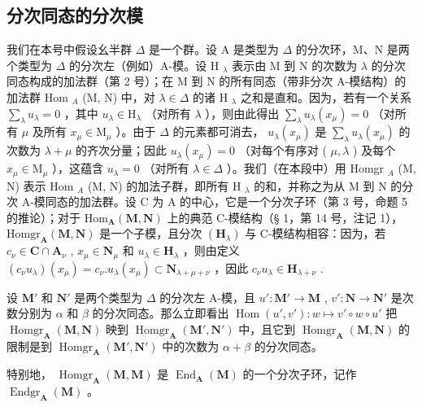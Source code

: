 \subsection{分次同态的分次模}

我们在本号中假设幺半群 \(\Delta\) 是一个群。设 A 是类型为 \(\Delta\) 的分次环，M、N 是两个类型为 \(\Delta\) 的分次左（例如）A-模。设 H \(_{\lambda}\) 表示由 M 到 N 的次数为 \(\lambda\) 的分次同态构成的加法群（第 2 号）；在 M 到 N 的所有同态（带非分次 A-模结构）的加法群 Hom \(_{A}\) (M, N) 中，对 \(\lambda \in \Delta\) 的诸 H \(_{\lambda}\) 之和是直和。因为，若有一个关系 \(\sum_{\lambda} u_{\lambda} = 0\) ，其中 \(u_{\lambda} \in \mathrm{H}_{\lambda}\) （对所有 \(\lambda\) ），则由此得出 \(\sum_{\lambda} u_{\lambda}(x_{\mu}) = 0\) （对所有 \(\mu\) 及所有 \(x_{\mu} \in \mathrm{M}_{\mu}\) ）。由于 \(\Delta\) 的元素都可消去， \(u_{\lambda}(x_{\mu})\) 是 \(\sum_{\lambda} u_{\lambda}(x_{\mu})\) 的次数为 \(\lambda + \mu\) 的齐次分量；因此 \(u_{\lambda}(x_{\mu}) = 0\) （对每个有序对 ( \(\mu, \lambda\) ) 及每个 \(x_{\mu} \in \mathrm{M}_{\mu}\) ），这蕴含 \(u_{\lambda} = 0\) （对所有 \(\lambda \in \Delta\) ）。我们（在本段中）用 Homgr \(_{A}\) (M, N) 表示 Hom \(_{A}\) (M, N) 的加法子群，即所有 H \(_{\lambda}\) 的和，并称之为从 M 到 N 的分次 A-模同态的加法群。设 C 为 A 的中心，它是一个分次子环（第 3 号，命题 5 的推论）；对于 \(\mathrm{Hom}_{\mathbf{A}}(\mathbf{M},\mathbf{N})\) 上的典范 C-模结构（§ 1，第 14 号，注记 1）， \(\mathrm{Homgr}_{\mathbf{A}}(\mathbf{M},\mathbf{N})\) 是一个子模，且分次 \((\mathbf{H}_{\lambda})\) 与 C-模结构相容：因为，若 \(c_{\nu}\in \mathbf{C}\cap \mathbf{A}_{\nu}\) , \(x_{\mu}\in \mathbf{N}_{\mu}\) 和 \(u_{\lambda}\in \mathbf{H}_{\lambda}\) ，则由定义 \((c_{\nu}u_{\lambda})(x_{\mu}) = c_{\nu}.u_{\lambda}(x_{\mu})\subset \mathbf{N}_{\lambda +\mu +\nu}\) ，因此 \(c_{\nu}u_{\lambda}\in \mathbf{H}_{\lambda +\nu}\) .

设 \(\mathbf{M}'\) 和 \(\mathbf{N}'\) 是两个类型为 \(\Delta\) 的分次左 A-模，且 \(u':\mathbf{M}'\to\mathbf{M}\) , \(v':\mathbf{N}\to\mathbf{N}'\) 是次数分别为 \(\alpha\) 和 \(\beta\) 的分次同态。那么立即看出 \(\operatorname{Hom}(u',v')\colon w\mapsto v'\circ w\circ u'\) 把 \(\operatorname{Homgr}_{\mathbf{A}}(\mathbf{M},\mathbf{N})\) 映到 \(\operatorname{Homgr}_{\mathbf{A}}(\mathbf{M}',\mathbf{N}')\) 中，且它到 \(\operatorname{Homgr}_{\mathbf{A}}(\mathbf{M},\mathbf{N})\) 的限制是到 \(\operatorname{Homgr}_{\mathbf{A}}(\mathbf{M}',\mathbf{N}')\) 中的次数为 \(\alpha+\beta\) 的分次同态。

特别地， \(\operatorname{Homgr}_{\mathbf{A}}(\mathbf{M}, \mathbf{M})\) 是 \(\operatorname{End}_{\mathbf{A}}(\mathbf{M})\) 的一个分次子环，记作 \(\operatorname{Endgr}_{\mathbf{A}}(\mathbf{M})\) 。

